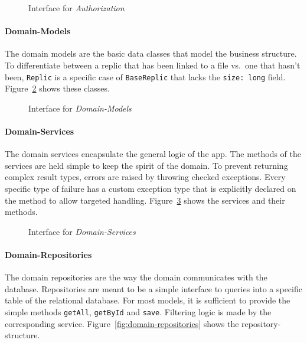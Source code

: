 \begin{figure}
    \centering

    \caption{Interface for \textit{Authorization}}
    \label{fig:inter-authorizer}
\end{figure}

\paragraph{Domain-Models}
The domain models are the basic data classes that model the business structure. \newline
To differentiate between a replic that has been linked to a file vs.\ one that hasn't been, \texttt{Replic} is a specific case of \texttt{BaseReplic} that lacks the \texttt{size: long} field.
Figure~\ref{fig:domain-models} shows these classes.

\begin{figure}
    \centering

    \caption{Interface for \textit{Domain-Models}}
    \label{fig:domain-models}
\end{figure}

\paragraph{Domain-Services} \label{par:domain-services}
The domain services encapsulate the general logic of the app. \newline
The methods of the services are held simple to keep the spirit of the domain.
To prevent returning complex result types, errors are raised by throwing checked exceptions.
Every specific type of failure has a custom exception type that is explicitly declared on the method to allow targeted handling.
Figure~\ref{fig:domain-services} shows the services and their methods.

\begin{figure}
    \centering

    \caption{Interface for \textit{Domain-Services}}
    \label{fig:domain-services}
\end{figure}

\paragraph{Domain-Repositories}\label{par:domain-repositories}
The domain repositories are the way the domain communicates with the database. \newline
Repositories are meant to be a simple interface to queries into a specific table of the relational database.
For most models, it is sufficient to provide the simple methods \texttt{getAll}, \texttt{getById} and \texttt{save}.
Filtering logic is made by the corresponding service.
Figure~\ref{fig:domain-repositories} shows the repository-structure.

